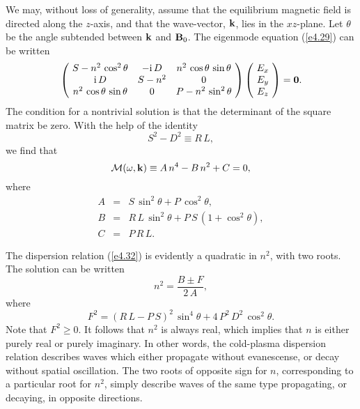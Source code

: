 We may, without loss of generality, assume that the equilibrium
magnetic field is directed along the $z$-axis, and that the wave-vector,
${\bf k}$, lies in the $xz$-plane. Let $\theta$ be the angle subtended between
${\bf k}$ and ${\bf B}_0$. The eigenmode equation (\ref{e4.29}) can be written
\begin{equation}\label{e4.30}
\left(\!\begin{array}{ccc}
S - n^2\,\cos^2\theta & -{\rm i}\,D & n^2\,\cos\theta\,\sin\theta\\
{\rm i} \,D           & S - n^2     & 0 \\
n^2\,\cos\theta\,\sin\theta & 0 & P - n^2\,\sin^2\theta
\end{array}\!\right)\left(\!
\begin{array}{c} E_x\\ E_y \\ E_z \end{array}\!\right) = {\bf 0}.
\end{equation}
The condition for a nontrivial solution is that the determinant of
the square matrix be zero. With the help of the identity
\begin{equation}
S^2 - D^2 \equiv R\,L,
\end{equation}
we find that
\begin{equation}\label{e4.32}
{\cal M}(\omega,{\bf k}) \equiv A\,n^4- B\,n^2 + C = 0,
\end{equation}
where
\begin{eqnarray}\label{e4.33a}
A &=& S\,\sin^2\theta + P\,\cos^2\theta,\label{e4.33b}\\[0.5ex]
B &=& R\,L\,\sin^2\theta + P\,S\,(1+\cos^2\theta),\\[0.5ex]\label{e4.33c}
C &=& P\,R\,L.
\end{eqnarray}

The dispersion relation (\ref{e4.32}) is evidently a quadratic in $n^2$, with
two roots. 
The solution can be written
\begin{equation}
n^2 = \frac{B\pm F}{2\,A},
\end{equation}
where
\begin{equation}
F^2 = (R\,L - P\,S)^2\,\sin^4\theta + 4\,P^2 \,D^2\,\cos^2\theta.
\end{equation}
Note that $F^2\geq 0$. It follows that $n^2$ is always real, which implies
that $n$ is either purely real or purely imaginary. In other words, the
cold-plasma dispersion relation describes waves which either propagate
without evanescense, or decay  without spatial oscillation. 
The two roots
of opposite sign for $n$, corresponding to a particular root for $n^2$, simply describe
 waves of the same type propagating, or decaying, in opposite directions. 

